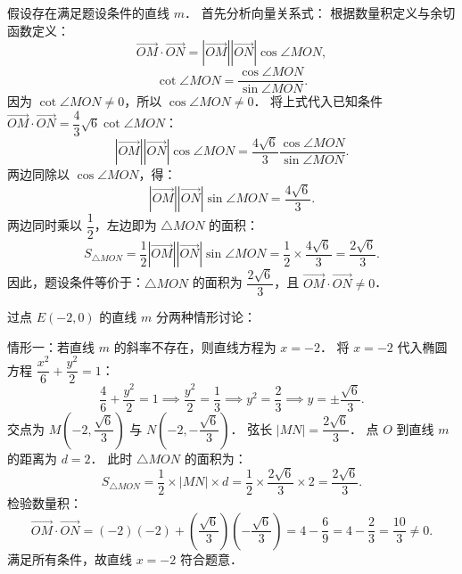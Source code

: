 \begin{answer}

假设存在满足题设条件的直线 $m$．
首先分析向量关系式：
根据数量积定义与余切函数定义：
\nopagebreak[4]
\[
\overrightarrow{OM} \cdot \overrightarrow{ON} = |\overrightarrow{OM}| |\overrightarrow{ON}| \cos\angle MON,
\]
\nopagebreak[4]
\[
\cot\angle MON = \frac{\cos\angle MON}{\sin\angle MON}.
\]
因为 $\cot\angle MON \neq 0$，所以 $\cos\angle MON \neq 0$．
将上式代入已知条件 $\overrightarrow{OM} \cdot \overrightarrow{ON} = \dfrac{4}{3}\sqrt{6}\cot\angle MON$：
\nopagebreak[4]
\[
|\overrightarrow{OM}| |\overrightarrow{ON}| \cos\angle MON = \frac{4\sqrt{6}}{3} \frac{\cos\angle MON}{\sin\angle MON}.
\]
两边同除以 $\cos\angle MON$，得：
\nopagebreak[4]
\[
|\overrightarrow{OM}| |\overrightarrow{ON}| \sin\angle MON = \frac{4\sqrt{6}}{3}.
\]
两边同时乘以 $\dfrac{1}{2}$，左边即为 $\triangle MON$ 的面积：
\nopagebreak[4]
\[
S_{\triangle MON} = \frac{1}{2} |\overrightarrow{OM}| |\overrightarrow{ON}| \sin\angle MON = \frac{1}{2} \times \frac{4\sqrt{6}}{3} = \frac{2\sqrt{6}}{3}.
\]
因此，题设条件等价于：$\triangle MON$ 的面积为 $\dfrac{2\sqrt{6}}{3}$，且 $\overrightarrow{OM} \cdot \overrightarrow{ON} \neq 0$．

过点 $E(-2, 0)$ 的直线 $m$ 分两种情形讨论：

情形一：若直线 $m$ 的斜率不存在，则直线方程为 $x = -2$．
将 $x = -2$ 代入椭圆方程 $\dfrac{x^2}{6} + \dfrac{y^2}{2} = 1$：
\nopagebreak[4]
\[
\frac{4}{6} + \frac{y^2}{2} = 1 \implies \frac{y^2}{2} = \frac{1}{3} \implies y^2 = \frac{2}{3} \implies y = \pm\frac{\sqrt{6}}{3}.
\]
交点为 $M\left(-2, \dfrac{\sqrt{6}}{3}\right)$ 与 $N\left(-2, -\dfrac{\sqrt{6}}{3}\right)$．
弦长 $|MN| = \dfrac{2\sqrt{6}}{3}$．
点 $O$ 到直线 $m$ 的距离为 $d = 2$．
此时 $\triangle MON$ 的面积为：
\nopagebreak[4]
\[
S_{\triangle MON} = \frac{1}{2} \times |MN| \times d = \frac{1}{2} \times \frac{2\sqrt{6}}{3} \times 2 = \frac{2\sqrt{6}}{3}.
\]
检验数量积：
\nopagebreak[4]
\[
\overrightarrow{OM} \cdot \overrightarrow{ON} = (-2)(-2) + \left(\frac{\sqrt{6}}{3}\right)\left(-\frac{\sqrt{6}}{3}\right) = 4 - \frac{6}{9} = 4 - \frac{2}{3} = \frac{10}{3} \neq 0.
\]
满足所有条件，故直线 $x = -2$ 符合题意．


\end{answer}
